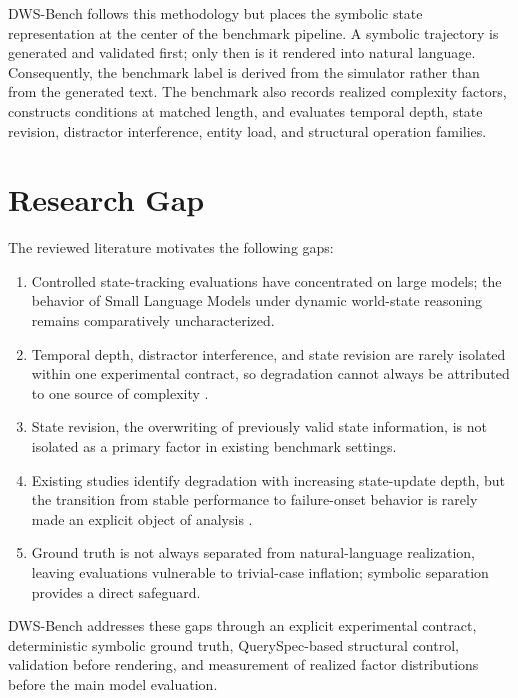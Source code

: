\documentclass{iutbscthesis}
\begin{document}
DWS-Bench follows this methodology but places the symbolic state representation at the center of the
benchmark pipeline. A symbolic trajectory is generated and validated first; only then is it rendered
into natural language. Consequently, the benchmark label is derived from the simulator rather than
from the generated text. The benchmark also records realized complexity factors, constructs
conditions at matched length, and evaluates temporal depth, state revision, distractor interference,
entity load, and structural operation families.

\section{Research Gap}
The reviewed literature motivates the following gaps:
\begin{enumerate}
\item Controlled state-tracking evaluations have concentrated on large models; the behavior of Small
Language Models under dynamic world-state reasoning remains comparatively uncharacterized.
\item Temporal depth, distractor interference, and state revision are rarely isolated within one
experimental contract, so degradation cannot always be attributed to one source of complexity
\cite{kim2023entity,rezaee2025exploring}.
\item State revision, the overwriting of previously valid state information, is not isolated as a
primary factor in existing benchmark settings.
\item Existing studies identify degradation with increasing state-update depth, but the transition
from stable performance to failure-onset behavior is rarely made an explicit object of analysis
\cite{rezaee2025exploring}.
\item Ground truth is not always separated from natural-language realization, leaving evaluations
vulnerable to trivial-case inflation; symbolic separation provides a direct safeguard.
\end{enumerate}

DWS-Bench addresses these gaps through an explicit experimental contract, deterministic symbolic
ground truth, QuerySpec-based structural control, validation before rendering, and measurement of
realized factor distributions before the main model evaluation.

\end{document}
